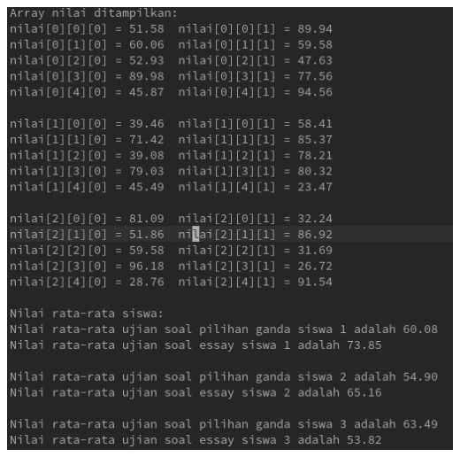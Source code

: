 \documentclass[a4paper,12pt]{article}
\begin{document}
\begin{center}
    \includegraphics[scale=.8]{2.png}
\end{center}
\end{document}
